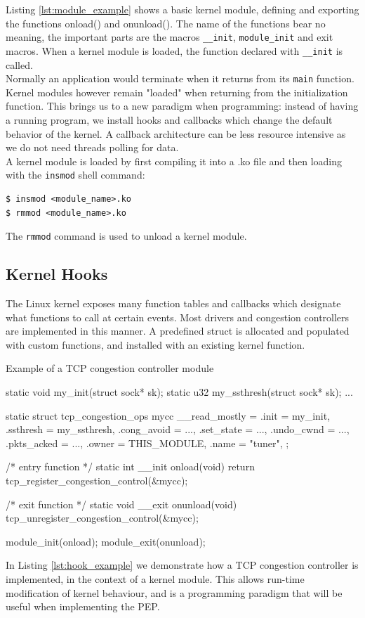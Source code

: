 \documentclass[a4paper,english, 11pt]{report}
\begin{document}
Listing \ref{lst:module_example} shows a basic kernel module, defining and exporting the functions onload() and onunload(). The name of the functions bear no meaning, the important parts are the macros \verb|__init|, \verb|module_init| and exit macros\cite{lkm}. When a kernel module is loaded, the function declared with \verb|__init| is called.\\

Normally an application would terminate when it returns from its \verb|main| function. Kernel modules however remain "loaded" when returning from the initialization function. This brings us to a new paradigm when programming: instead of having a running program, we install hooks and callbacks which change the default behavior of the kernel. A callback architecture can be less resource intensive as we do not need threads polling for data.\\

A kernel module is loaded by first compiling it into a .ko file and then loading with the \verb|insmod| shell command:
\begin{verbatim}
$ insmod <module_name>.ko
$ rmmod <module_name>.ko
\end{verbatim}
The \verb|rmmod| command is used to unload a kernel module. 

\subsection{Kernel Hooks}
The Linux kernel exposes many function tables and callbacks which designate what functions to call at certain events. Most drivers and congestion controllers are implemented in this manner. A predefined struct is allocated and populated with custom functions, and installed with an existing kernel function.

\begin{autonumlstlisting}[label=lst:hook_example]{Example of a TCP congestion controller module}

static void my_init(struct sock* sk);
static u32 my_ssthresh(struct sock* sk);
...

static struct tcp_congestion_ops mycc __read_mostly = {
  .init           = my_init,
  .ssthresh       = my_ssthresh,
  .cong_avoid     = ...,
  .set_state      = ...,
  .undo_cwnd      = ...,
  .pkts_acked     = ...,
  .owner          = THIS_MODULE,
  .name           = "tuner",
};

/* entry function */
static int __init onload(void) {
    return tcp_register_congestion_control(&mycc);
}

/* exit function */
static void __exit onunload(void) {
    tcp_unregister_congestion_control(&mycc);
}

module_init(onload);
module_exit(onunload);
\end{autonumlstlisting}
In Listing \ref{lst:hook_example} we demonstrate how a TCP congestion controller is implemented, in the context of a kernel module. This allows run-time modification of kernel behaviour, and is a programming paradigm that will be useful when implementing the PEP.
\end{document}
